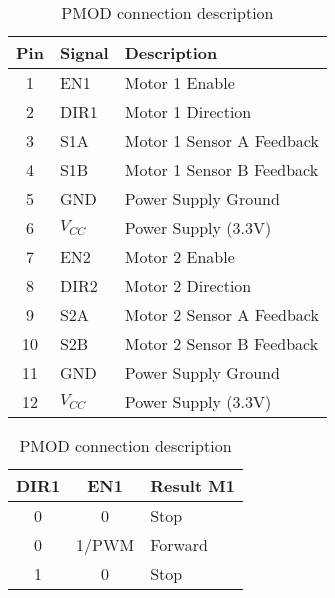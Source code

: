 \documentclass[Main]{subfiles}
\begin{document}
			\begin{table}[h]
				\centering
				\begin{subtable}[b]{0.6\linewidth}
					\begin{tabular}{|c|l|l|}
						\hline
						{\bf Pin} & {\bf Signal} & {\bf Description}         \\ \hline
						1         & EN1          & Motor 1 Enable            \\ \hline
						2         & DIR1         & Motor 1 Direction         \\ \hline
						3         & S1A          & Motor 1 Sensor A Feedback \\ \hline
						4         & S1B          & Motor 1 Sensor B Feedback \\ \hline
						5         & GND          & Power Supply Ground       \\ \hline
						6         & $V_{CC}$     & Power Supply (3.3V)       \\ \hline
						7         & EN2          & Motor 2 Enable            \\ \hline
						8         & DIR2         & Motor 2 Direction         \\ \hline
						9         & S2A          & Motor 2 Sensor A Feedback \\ \hline
						10        & S2B          & Motor 2 Sensor B Feedback \\ \hline
						11        & GND          & Power Supply Ground       \\ \hline
						12        & $V_{CC}$   & Power Supply (3.3V)       \\ \hline
					\end{tabular}
					\caption{PMOD connection description}
					\label{tab:dhb_pmod}
				\end{subtable}
				\begin{subtable}[b]{0.3\linewidth}
					\centering
					\begin{tabular}{ccl}
						\hline
						\multicolumn{1}{|c|}{{\bf DIR1}} & \multicolumn{1}{c|}{{\bf EN1}} & \multicolumn{1}{l|}{{\bf Result M1}} \\ \hline
						\multicolumn{1}{|c|}{0}          & \multicolumn{1}{c|}{0}         & \multicolumn{1}{l|}{Stop}            \\ \hline
						\multicolumn{1}{|c|}{0}          & \multicolumn{1}{c|}{1/PWM}     & \multicolumn{1}{l|}{Forward}         \\ \hline
						\multicolumn{1}{|c|}{1}          & \multicolumn{1}{c|}{0}         & \multicolumn{1}{l|}{Stop}            \\ \hline

\end{tabular}
\end{subtable}
\end{table}
\end{document}
